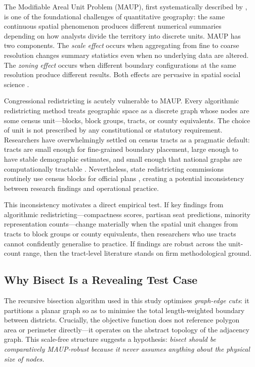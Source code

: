 The Modifiable Areal Unit Problem (MAUP), first systematically described by
\citet{openshaw1984modifiable}, is one of the foundational challenges of
quantitative geography: the same continuous spatial phenomenon produces
different numerical summaries depending on how analysts divide the territory
into discrete units.  MAUP has two components.  The \emph{scale effect}
occurs when aggregating from fine to coarse resolution changes summary
statistics even when no underlying data are altered.  The \emph{zoning
effect} occurs when different boundary configurations at the same resolution
produce different results.  Both effects are pervasive in spatial social
science \citep{openshaw1983modifiable, jelinski1996modifiable}.

Congressional redistricting is acutely vulnerable to MAUP.  Every
algorithmic redistricting method treats geographic space as a discrete graph
whose nodes are some census unit---blocks, block groups, tracts, or county
equivalents.  The choice of unit is not prescribed by any constitutional or
statutory requirement.  Researchers have overwhelmingly settled on census
tracts as a pragmatic default: tracts are small enough for fine-grained
boundary placement, large enough to have stable demographic estimates, and
small enough that national graphs are computationally tractable
\citep{census_tracts_reference}.  Nevertheless, state redistricting
commissions routinely use census blocks for official plans
\citep{ncsl_redistricting}, creating a potential inconsistency between
research findings and operational practice.

This inconsistency motivates a direct empirical test.  If key findings from
algorithmic redistricting---compactness scores, partisan seat predictions,
minority representation counts---change materially when the spatial unit
changes from tracts to block groups or county equivalents, then researchers
who use tracts cannot confidently generalise to practice.  If findings are
robust across the unit-count range, then the tract-level literature stands on
firm methodological ground.

\subsection{Why Bisect Is a Revealing Test Case}

The recursive bisection algorithm used in this study optimises
\emph{graph-edge cuts}: it partitions a planar graph so as to minimise the
total length-weighted boundary between districts.  Crucially, the objective
function does not reference polygon area or perimeter directly---it operates
on the abstract topology of the adjacency graph.  This scale-free structure
suggests a hypothesis: \emph{bisect should be comparatively MAUP-robust
because it never assumes anything about the physical size of nodes.}

